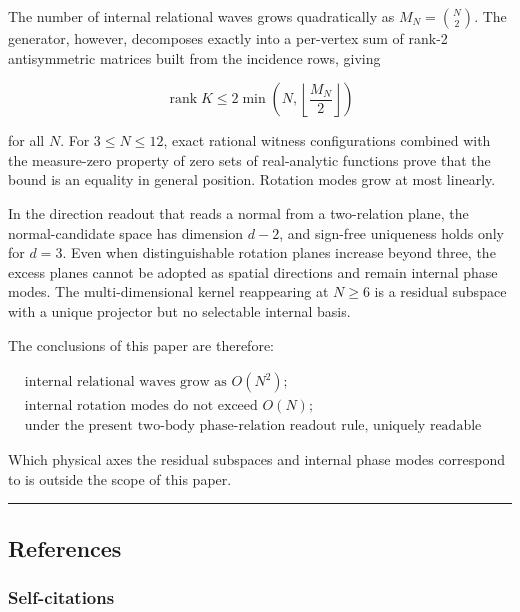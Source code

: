 \documentclass[
  a4paper,
]{article}
\begin{document}
The number of internal relational waves grows quadratically as
\(M_N=\binom{N}{2}\). The generator, however, decomposes exactly into a
per-vertex sum of rank-2 antisymmetric matrices built from the incidence
rows, giving

\[
\operatorname{rank}K\le2\min\!\left(N,\left\lfloor\frac{M_N}{2}\right\rfloor\right)
\]

for all \(N\). For \(3\le N\le12\), exact rational witness
configurations combined with the measure-zero property of zero sets of
real-analytic functions prove that the bound is an equality in general
position. Rotation modes grow at most linearly.

In the direction readout that reads a normal from a two-relation plane,
the normal-candidate space has dimension \(d-2\), and sign-free
uniqueness holds only for \(d=3\). Even when distinguishable rotation
planes increase beyond three, the excess planes cannot be adopted as
spatial directions and remain internal phase modes. The
multi-dimensional kernel reappearing at \(N\ge6\) is a residual subspace
with a unique projector but no selectable internal basis.

The conclusions of this paper are therefore:

\[
\boxed{
\begin{aligned}
&\text{internal relational waves grow as }O(N^2);\\
&\text{internal rotation modes do not exceed }O(N);\\
&\text{under the present two-body phase-relation readout rule, uniquely readable spatial directions saturate at three.}
\end{aligned}
}
\]

Which physical axes the residual subspaces and internal phase modes
correspond to is outside the scope of this paper.

\begin{center}\rule{0.5\linewidth}{0.5pt}\end{center}

\subsection{References}\label{references}

\subsubsection{Self-citations}\label{self-citations}
\end{document}
